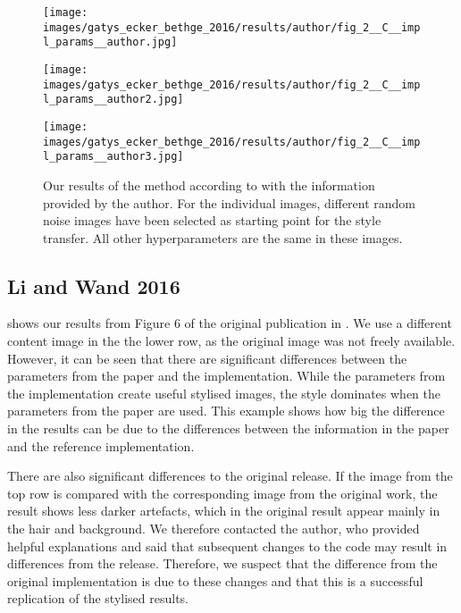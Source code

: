 \begin{figure}[H]
	\centering
	\begin{minipage}[t]{0.3\textwidth}
		\centering
		\texttt{[image: images/gatys\_ecker\_bethge\_2016/results/author/fig\_2\_\_C\_\_impl\_params\_\_author.jpg]}
	\end{minipage}
	\hfill%
	\begin{minipage}[t]{0.3\textwidth}
		\centering
		\texttt{[image: images/gatys\_ecker\_bethge\_2016/results/author/fig\_2\_\_C\_\_impl\_params\_\_author2.jpg]}
	\end{minipage}
	\hfill%
	\begin{minipage}[t]{0.3\textwidth}
		\centering
		\texttt{[image: images/gatys\_ecker\_bethge\_2016/results/author/fig\_2\_\_C\_\_impl\_params\_\_author3.jpg]}
	\end{minipage}
	\caption{Our results of the method according to \cite{GEB2016} with the information provided by the author. For the individual images, different random noise images have been selected as starting point for the style transfer. All other hyperparameters are the same in these images.}
	\label{fig:GEB2016_random_init}
\end{figure}


\subsection{Li and Wand 2016}

 shows our results from Figure 6 of the original publication in \cite{LW2016}. We use a different content image in the the lower row, as the original image was not freely available. However, it can be seen that there are significant differences between the parameters from the paper and the implementation. While the parameters from the implementation create useful stylised images, the style dominates when the parameters from the paper are used. This example shows how big the difference in the results can be due to the differences between the information in the paper and the reference implementation.

There are also significant differences to the original release. If the image from the top row is compared with the corresponding image from the original work, the result shows less darker artefacts, which in the original result appear mainly in the hair and background. We therefore contacted the author, who provided helpful explanations and said that subsequent changes to the code may result in differences from the release. Therefore, we suspect that the difference from the original implementation is due to these changes and that this is a successful replication of the stylised results.

